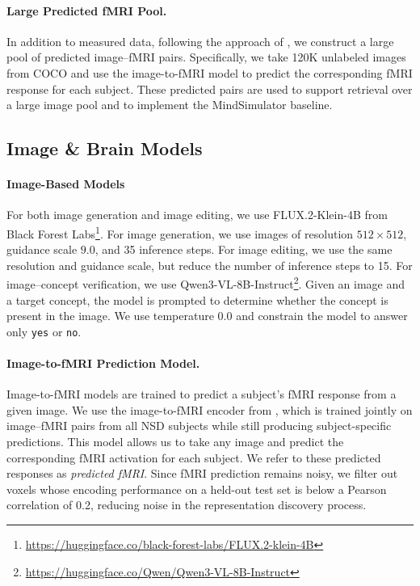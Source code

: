\documentclass{llmxive}
\begin{document}
\vspace{-0.15cm}
\paragraph{Large Predicted fMRI Pool.}
In addition to measured data, following the approach of \citet{Bao2025MindSimulator}, we construct a large pool of predicted image--fMRI pairs. Specifically, we take 120K unlabeled images from COCO and use the image-to-fMRI model to predict the corresponding fMRI response for each subject. These predicted pairs are used to support retrieval over a large image pool and to implement the MindSimulator baseline.


\subsection{Image \& Brain Models}
\label{sec_sup:image-brain_models}

\paragraph{Image-Based Models}
For both image generation and image editing, we use FLUX.2-Klein-4B from Black Forest Labs\footnote{\url{https://huggingface.co/black-forest-labs/FLUX.2-klein-4B}}.
For image generation, we use images of resolution $512 \times 512$, guidance scale $9.0$, and 35 inference steps. For image editing, we use the same resolution and guidance scale, but reduce the number of inference steps to 15.
For image--concept verification, we use Qwen3-VL-8B-Instruct\footnote{\url{https://huggingface.co/Qwen/Qwen3-VL-8B-Instruct}}.
Given an image and a target concept, the model is prompted to determine whether the concept is present in the image. We use temperature $0.0$ and constrain the model to answer only \texttt{yes} or \texttt{no}.

\vspace{-0.15cm}
\paragraph{Image-to-fMRI Prediction Model.}
Image-to-fMRI models are trained to predict a subject's fMRI response from a given image. We use the image-to-fMRI encoder from \citet{Beliy2024Wisdom}, which is trained jointly on image--fMRI pairs from all NSD subjects while still producing subject-specific predictions. This model allows us to take any image and predict the corresponding fMRI activation for each subject. We refer to these predicted responses as \emph{predicted fMRI}. Since fMRI prediction remains noisy, we filter out voxels whose encoding performance on a held-out test set is below a Pearson correlation of 0.2, reducing noise in the representation discovery process.
\end{document}
